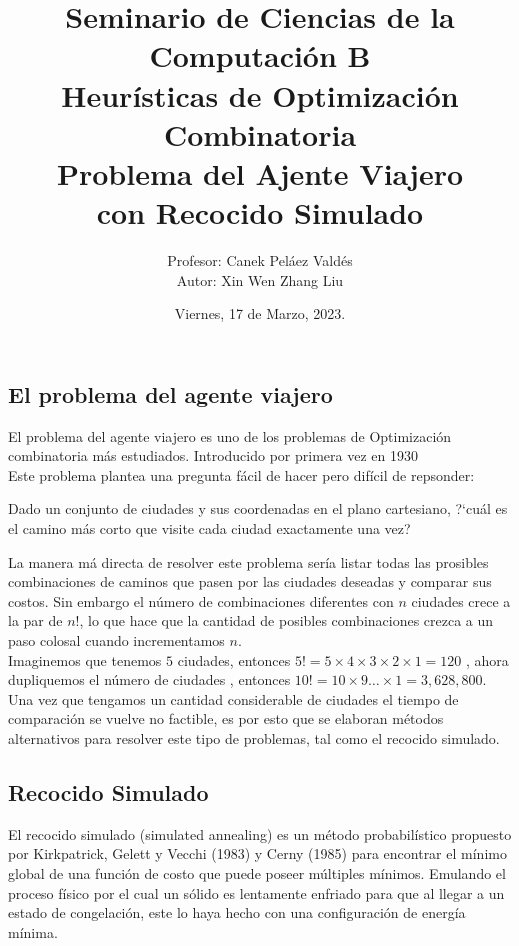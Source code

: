\documentclass[a4paper]{article}
\title { \Large{Seminario de Ciencias de la Computaci\'on B}\protect\\
  \large{Heurísticas de Optimización Combinatoria}\protect\\
  \large{Problema del Ajente Viajero\\con Recocido Simulado}}
\date{\normalsize{Viernes, 17 de Marzo, 2023.}}
\author{\normalsize{Profesor: Canek Peláez Valdés}\protect\\
  \normalsize{Autor: Xin Wen Zhang Liu}}\vspace{0.2cm}
\begin{document}
\allowdisplaybreaks
\maketitle

\subsection*{El problema del agente viajero}
El problema del agente viajero es uno de los problemas de Optimización combinatoria m\'as estudiados. Introducido por primera vez en 1930 \\

Este problema plantea una pregunta f\'acil de hacer pero dif\'icil de repsonder:
\begin{center}
  Dado un conjunto de ciudades y sus coordenadas en el plano cartesiano, ?`cu\'al es el camino m\'as corto que visite cada ciudad exactamente una vez?
\end{center}
La manera m\'a directa de resolver este problema ser\'ia listar todas las prosibles combinaciones de caminos que pasen por las ciudades deseadas y comparar sus costos. Sin embargo el n\'umero de combinaciones diferentes con $n$ ciudades crece a la par de  $n!$, lo que hace que la cantidad de posibles combinaciones crezca a un paso colosal cuando incrementamos $n$.\\

Imaginemos que tenemos $5$ ciudades, entonces $5! = 5\times 4\times 3 \times 2\times 1 = 120$ , ahora dupliquemos el n\'umero de ciudades , entonces $10! = 10 \times 9 \dots \times 1 = 3,628,800$. Una vez que tengamos un cantidad considerable de ciudades el tiempo de comparaci\'on se vuelve no factible,  es por esto que se elaboran m\'etodos alternativos para resolver este tipo de problemas, tal como el recocido simulado.

\subsection*{Recocido Simulado}
El  recocido simulado  (simulated annealing)  es un m\'etodo probabil\'istico propuesto por Kirkpatrick, Gelett y Vecchi (1983) y Cerny (1985) para encontrar el m\'inimo global de una funci\'on de costo que puede poseer m\'ultiples m\'inimos. Emulando el proceso f\'isico por el cual un s\'olido es lentamente enfriado para que al llegar a un estado de congelaci\'on, este lo haya hecho con una configuraci\'on de energ\'ia m\'inima.  ~\cite{sa}\\
\end{document}
